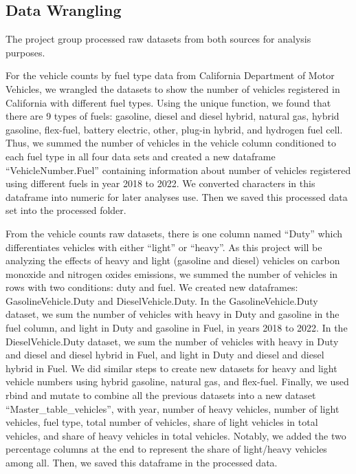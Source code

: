 \documentclass[
  12pt,
]{article}
\begin{document}
\hypertarget{data-wrangling}{%
\subsection{Data Wrangling}\label{data-wrangling}}

The project group processed raw datasets from both sources for analysis
purposes.

For the vehicle counts by fuel type data from California Department of
Motor Vehicles, we wrangled the datasets to show the number of vehicles
registered in California with different fuel types. Using the unique
function, we found that there are 9 types of fuels: gasoline, diesel and
diesel hybrid, natural gas, hybrid gasoline, flex-fuel, battery
electric, other, plug-in hybrid, and hydrogen fuel cell. Thus, we summed
the number of vehicles in the vehicle column conditioned to each fuel
type in all four data sets and created a new dataframe
``VehicleNumber.Fuel'' containing information about number of vehicles
registered using different fuels in year 2018 to 2022. We converted
characters in this dataframe into numeric for later analyses use. Then
we saved this processed data set into the processed folder.

From the vehicle counts raw datasets, there is one column named ``Duty''
which differentiates vehicles with either ``light'' or ``heavy''. As
this project will be analyzing the effects of heavy and light (gasoline
and diesel) vehicles on carbon monoxide and nitrogen oxides emissions,
we summed the number of vehicles in rows with two conditions: duty and
fuel. We created new dataframes: GasolineVehicle.Duty and
DieselVehicle.Duty. In the GasolineVehicle.Duty dataset, we sum the
number of vehicles with heavy in Duty and gasoline in the fuel column,
and light in Duty and gasoline in Fuel, in years 2018 to 2022. In the
DieselVehicle.Duty dataset, we sum the number of vehicles with heavy in
Duty and diesel and diesel hybrid in Fuel, and light in Duty and diesel
and diesel hybrid in Fuel. We did similar steps to create new datasets
for heavy and light vehicle numbers using hybrid gasoline, natural gas,
and flex-fuel. Finally, we used rbind and mutate to combine all the
previous datasets into a new dataset ``Master\_table\_vehicles'', with
year, number of heavy vehicles, number of light vehicles, fuel type,
total number of vehicles, share of light vehicles in total vehicles, and
share of heavy vehicles in total vehicles. Notably, we added the two
percentage columns at the end to represent the share of light/heavy
vehicles among all. Then, we saved this dataframe in the processed data.
\end{document}
